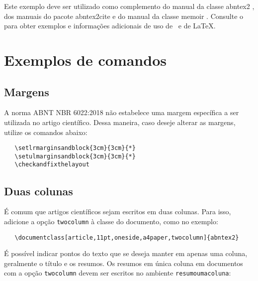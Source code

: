 \documentclass[
	article,			%
	11pt,				%
	oneside,			%
	a4paper,			%
	chapter=TITLE,		%
	english,			%
	brazil,				%
	sumario=tradicional
	]{abntex2}
\begin{document}
Este exemplo deve ser utilizado como complemento do manual da classe
\textsf{abntex2} \cite{abntex2classe}, dos manuais do pacote
\textsf{abntex2cite} \cite{abntex2cite,abntex2cite-alf} e do manual da classe
\textsf{memoir} \cite{memoir}. Consulte o  para obter
exemplos e informações adicionais de uso de \abnTeX\ e de \LaTeX.

\section*{Exemplos de comandos}

\subsection*{Margens}

A norma ABNT NBR 6022:2018 não estabelece uma margem específica a ser utilizada
no artigo científico. Dessa maneira, caso deseje alterar as margens, utilize os
comandos abaixo:

\begin{verbatim}
   \setlrmarginsandblock{3cm}{3cm}{*}
   \setulmarginsandblock{3cm}{3cm}{*}
   \checkandfixthelayout
\end{verbatim}

\subsection*{Duas colunas}

É comum que artigos científicos sejam escritos em duas colunas. Para isso,
adicione a opção \texttt{twocolumn} à classe do documento, como no exemplo:

\begin{verbatim}
   \documentclass[article,11pt,oneside,a4paper,twocolumn]{abntex2}
\end{verbatim}

É possível indicar pontos do texto que se deseja manter em apenas uma coluna,
geralmente o título e os resumos. Os resumos em única coluna em documentos com
a opção \texttt{twocolumn} devem ser escritos no ambiente
\texttt{resumoumacoluna}:
\end{document}
